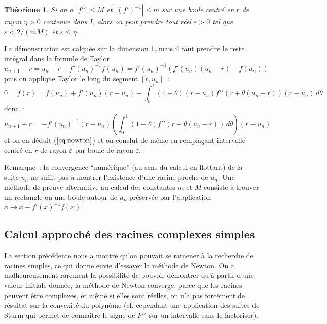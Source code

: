 \documentclass[a4paper,11pt]{article}
\newtheorem{thm}{Théorème}
\begin{document}
\begin{giacjshere}
\begin{thm}
Si on a $|f'{'}| \leq M$ et $|(f')^{-1}| \leq m$ sur une boule
centr\'e en $r$ de rayon $\eta>0$ contenue dans $I$, alors on peut prendre tout r\'eel
$\varepsilon>0$ tel que $\varepsilon < 2/(mM)$ et $\varepsilon \leq \eta$.
\end{thm}
La d\'emonstration est calqu\'ee sur la dimension 1, mais il faut
prendre le reste int\'egral dans la formule de Taylor
\[ u_{n+1}-r = u_n - r - f'(u_n)^{-1} f(u_n) = 
f'(u_n)^{-1} (f'(u_n)(u_n-r)-f(u_n) ) \]
puis on applique Taylor le long du segment $[r,u_n]$~:
\[ 0 = f(r)=f(u_n)+ f'(u_n) (r-u_n)+  \int_0^1 (1-\theta)(r-u_n)
f'{'}(r+\theta (u_n-r)) (r-u_n) \, d\theta \]
donc~:
$$u_{n+1}-r =-f'(u_n)^{-1}  (r-u_n) 
\left(\int_0^1 (1-\theta)f'{'}(r+\theta (u_n-r)) \, d\theta \right) (r-u_n)  $$
et on en d\'eduit (\(\ref{eq:newton}\)) et on conclut de m\^eme en
rempla\c{c}ant intervalle centr\'e en $r$ de rayon $\varepsilon$
par boule de rayon $\varepsilon$.

Remarque~: la convergence ``num\'erique'' (au sens du calcul en
flottant) de la suite $u_n$ ne suffit pas \`a montrer l'existence
d'une racine proche de $u_n$. Une m\'ethode de preuve alternative
au calcul des constantes $m$ et $M$ consiste
\`a trouver un rectangle ou une boule autour de $u_n$ pr\'eserv\'ee
par l'application $x\rightarrow x-f'(x)^{-1} f(x)$.



\subsection{Calcul approch\'e des racines complexes simples} 
  \label{sec:proot}
La section pr\'ec\'edente nous a montr\'e qu'on pouvait
se ramener \`a la recherche de racines simples, ce qui 
donne envie d'essayer la m\'ethode de Newton. On a malheureusement
rarement la possibilit\'e de pouvoir d\'emontrer qu'\`a partir d'une valeur
initiale donn\'ee, la m\'ethode de Newton converge, 
parce que les racines peuvent \^etre complexes, et m\^eme si elles
sont r\'eelles, on n'a pas forc\'ement de r\'esultat sur la convexit\'e
du polyn\^ome (cf. cependant une application des suites de
Sturm qui permet de connaitre le signe
de $P'{'}$ sur un intervalle sans le factoriser).


\end{giacjshere}
\end{document}
